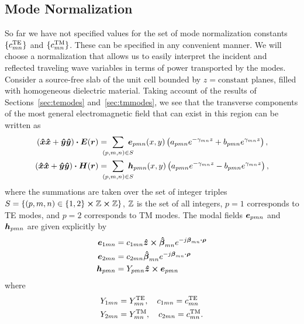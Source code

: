 \subsection{Mode Normalization}
So far we have not specified values for 
the set of mode normalization constants $\{c_{mn}^{\text{TE}}\}$ and
$\{c_{mn}^{\text{TM}}\}$.  These can be specified in any convenient manner.  We
will choose a normalization that allows us to easily interpret the
incident and reflected traveling wave variables in terms of power
transported by the modes.  Consider a source-free slab of the unit cell bounded by
$z = \text{constant}$ planes, filled with homogeneous dielectric
material.  Taking account of the results of Sections~\ref{sec:temodes}
and~\ref{sec:tmmodes}, we see that the transverse components of the
most general electromagnetic field that can exist in
this region can be written as
\begin{subequations}
  \label{eq:modalexpansions}
  \begin{align}
    (\x\x+\y\y) \bdot \E(\r) &= 
    \mkern -15mu \sum_{(p,m,n) \in S} \mkern -15mu
    \e_{pmn}(x,y) 
    \left(
      a_{pmn} e^{-\gamma_{mn} z} + b_{pmn} e^{\gamma_{mn} z}
    \right), \\
    (\x\x+\y\y) \bdot \H(\r) &= 
    \mkern -15mu \sum_{(p,m,n) \in S} \mkern -15mu
    \h_{pmn}(x,y) 
    \left(
      a_{pmn} e^{-\gamma_{mn} z} - b_{pmn} e^{\gamma_{mn} z}
    \right),
  \end{align}
\end{subequations}
where the summations are taken over the set of integer triples 
$S = \{(p,m,n) \in \{1,2\}
\boldsymbol{\times} \mathbb{Z} \boldsymbol{\times} \mathbb{Z}\}$, $\mathbb{Z}$ is the set of
all integers, $p=1$ corresponds to TE modes, and $p=2$ corresponds to
TM modes.  The modal fields $\boldsymbol{e}_{pmn}$ and $\boldsymbol{h}_{pmn}$ are given
explicitly by
\begin{subequations}
  \label{eq:modaldefs}
  \begin{align}
    \e_{1mn} &= 
      c_{1mn}  \z \cross \betahat_{mn} e^{-j\vecbeta_{mn} \bdot \vecrho}
       \\
    \e_{2mn} &= 
      c_{2mn}  \betahat_{mn} e^{-j\vecbeta_{mn} \bdot \vecrho}
      \hphantom{\z \cross \mbox{}}
      \\
    \h_{pmn} &= Y_{pmn} \z \cross \e_{pmn} 
  \end{align}
\end{subequations}
where 
\begin{subequations}
  \begin{align}
    Y_{1mn} &= Y_{mn}^{\text{TE}}, \quad  c_{1mn} = c_{mn}^{\text{TE}} \\
    Y_{2mn} &= Y_{mn}^{\text{TM}}, \quad  c_{2mn} = c_{mn}^{\text{TM}}.
  \end{align}
\end{subequations}


